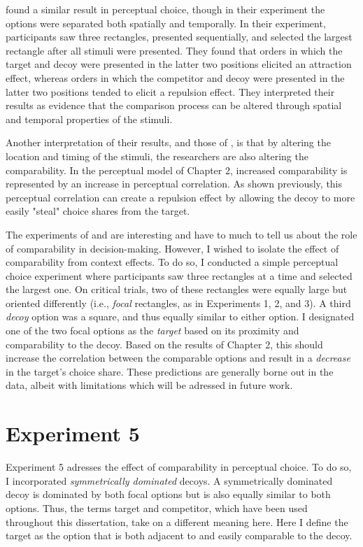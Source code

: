 \textcite{evansImpactPresentationOrder2021} found a similar result in perceptual choice, though in their experiment the options were separated both spatially and temporally. In their experiment, participants saw three rectangles, presented sequentially, and selected the largest rectangle after all stimuli were presented. They found that orders in which the target and decoy were presented in the latter two positions elicited an attraction effect, whereas orders in which the competitor and decoy were presented in the latter two positions tended to elicit a repulsion effect. They interpreted their results as evidence that the comparison process can be altered through spatial and temporal properties of the stimuli.

Another interpretation of their results, and those of \textcite{trueblood2022attentional}, is that by altering the location and timing of the stimuli, the researchers are also altering the comparability. In the perceptual model of Chapter 2, increased comparability is represented by an increase in perceptual correlation. As shown previously, this perceptual correlation can create a repulsion effect by allowing the decoy to more easily "steal" choice shares from the target.

The experiments of \textcite{evansImpactPresentationOrder2021} and \textcite{trueblood2015fragile} are interesting and have to much to tell us about the role of comparability in decision-making. However, I wished to isolate the effect of comparability from context effects. To do so, I conducted a simple perceptual choice experiment where participants saw three rectangles at a time and selected the largest one. On critical trials, two of these rectangles were equally large but oriented differently (i.e., \textit{focal} rectangles, as in Experiments 1, 2, and 3). A third \textit{decoy} option was a square, and thus equally similar to either option. I designated one of the two focal options as the \textit{target} based on its proximity and comparability to the decoy. Based on the results of Chapter 2, this should increase the correlation between the comparable options and result in a \textit{decrease} in the target's choice share. These predictions are generally borne out in the data, albeit with limitations which will be adressed in future work.

\section{Experiment 5}
Experiment 5 adresses the effect of comparability in perceptual choice. To do so, I incorporated \textit{symmetrically dominated} decoys. A symmetrically dominated decoy is dominated by both focal options but is also equally similar to both options. Thus, the terms target and competitor, which have been used throughout this dissertation, take on a different meaning here. Here I define the target as the option that is both adjacent to and easily comparable to the decoy.

